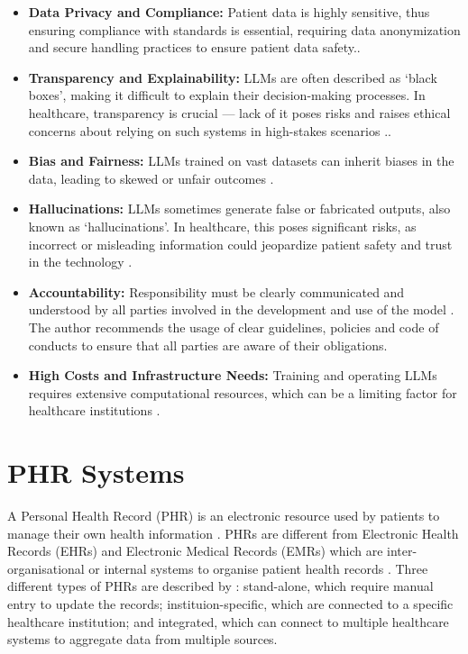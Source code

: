 \begin{itemize}
    \item \textbf{Data Privacy and Compliance:} Patient data is highly sensitive, thus ensuring compliance with standards is essential, requiring data anonymization and secure handling practices to ensure patient data safety.\parencite{llm_healthcare,llm_healthcare2,llm_healthcare4}.
    \item \textbf{Transparency and Explainability:} LLMs are often described as `black boxes', making it difficult to explain their decision-making processes. In healthcare, transparency is crucial --- lack of it poses risks and raises ethical concerns about relying on such systems in high-stakes scenarios \parencite{llm_healthcare,llm_healthcare2,llm_healthcare4}..
    \item \textbf{Bias and Fairness:} LLMs trained on vast datasets can inherit biases in the data, leading to skewed or unfair outcomes \parencite{llm_healthcare2}.
    \item \textbf{Hallucinations:} LLMs sometimes generate false or fabricated outputs, also known as `hallucinations'. In healthcare, this poses significant risks, as incorrect or misleading information could jeopardize patient safety and trust in the technology \parencite{llm_healthcare4,llm_healthcare}.
    \item \textbf{Accountability:} Responsibility must be clearly communicated and understood by all parties involved in the development and use of the model \parencite{llm_healthcare2}. The author recommends the usage of clear guidelines, policies and code of conducts to ensure that all parties are aware of their obligations.
    \item \textbf{High Costs and Infrastructure Needs:} Training and operating LLMs requires extensive computational resources, which can be a limiting factor for healthcare institutions \parencite{llm_healthcare4}.
\end{itemize}

\section{PHR Systems}

A Personal Health Record (PHR) is an electronic resource
used by patients to manage their own health information \parencite{phrsecurity,phrlist}. PHRs are different from Electronic Health Records (EHRs) and Electronic Medical Records (EMRs) which are inter-organisational or internal systems to organise patient health records \parencite{phrdiff,phrlist}. Three different types of PHRs are described by \textcite{phrsecurity}: stand-alone, which require manual entry to update the records; instituion-specific, which are connected to a specific healthcare institution; and integrated, which can connect to multiple healthcare systems to aggregate data from multiple sources. 

